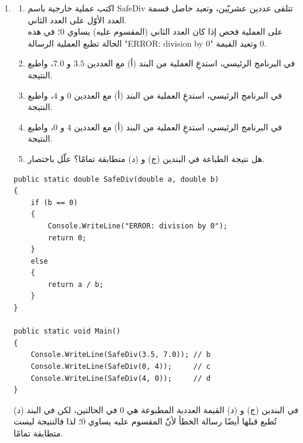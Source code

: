 \documentclass[14pt]{extarticle}
\begin{document}
\begin{enumerate}[resume, itemsep=2em]
\item
\begin{enumerate}
    \item اكتب عملية خارجية باسم \textenglish{SafeDiv} تتلقى عددين عشريّين، وتعيد حاصل قسمة العدد الأوّل على العدد الثاني. \\
    على العملية فحص إذا كان العدد الثاني (المقسوم عليه) يساوي $0$؛ في هذه الحالة تطبع العملية الرسالة \textenglish{"ERROR: division by 0"} وتعيد القيمة $0$.
    \item في البرنامج الرئيسي، استدعِ العملية من البند (أ) مع العددين $3.5$ و $7.0$، واطبع النتيجة.
    \item في البرنامج الرئيسي، استدعِ العملية من البند (أ) مع العددين $0$ و $4$، واطبع النتيجة.
    \item في البرنامج الرئيسي، استدعِ العملية من البند (أ) مع العددين $4$ و $0$، واطبع النتيجة.
    \item هل نتيجة الطباعة في البندين (ج) و (د) متطابقة تمامًا؟ علّل باختصار.
\end{enumerate}
\ifwithsols
\begin{boxSolution}
\begin{english}
\begin{verbatim}
public static double SafeDiv(double a, double b)
{
    if (b == 0)
    {
        Console.WriteLine("ERROR: division by 0");
        return 0;
    }
    else
    {
        return a / b;
    }
}

public static void Main()
{
    Console.WriteLine(SafeDiv(3.5, 7.0)); // b
    Console.WriteLine(SafeDiv(0, 4));     // c
    Console.WriteLine(SafeDiv(4, 0));     // d
}
\end{verbatim}
\end{english}
\par
في البندين (ج) و (د) القيمة العددية المطبوعة هي $0$ في الحالتين، لكن في البند (د) تُطبع قبلها أيضًا رسالة الخطأ لأنّ المقسوم عليه يساوي $0$؛ لذا فالنتيجة ليست متطابقة تمامًا.
\end{boxSolution}
\fi
\filbreak


\end{enumerate}
\end{document}
